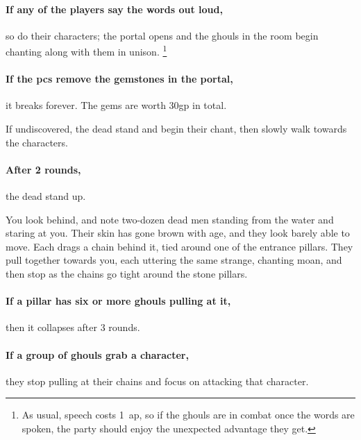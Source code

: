 \paragraph{If any of the players say the words out loud,}
so do their characters; the portal opens and the ghouls in the room begin chanting along with them in unison.%
\footnote{As usual, speech costs 1~\gls{ap}, so if the ghouls are in combat once the words are spoken, the party should enjoy the unexpected advantage they get.}

\paragraph{If the \glspl{pc} remove the gemstones in the portal,}
it breaks forever.
The gems are worth 30gp in total.

If undiscovered, the dead stand and begin their chant, then slowly walk towards the characters.

\paragraph{After 2 rounds,}
the dead stand up.

\begin{boxtext}
  You look behind, and note two-dozen dead men standing from the water and staring at you.
  Their skin has gone brown with age, and they look barely able to move.
  Each drags a chain behind it, tied around one of the entrance pillars.
  They pull together towards you, each uttering the same strange, chanting moan, and then stop as the chains go tight around the stone pillars.
\end{boxtext}

\paragraph{If a pillar has six or more ghouls pulling at it,}
then it collapses after 3 rounds.

\paragraph{If a group of ghouls grab a character,}
they stop pulling at their chains and focus on attacking that character.

